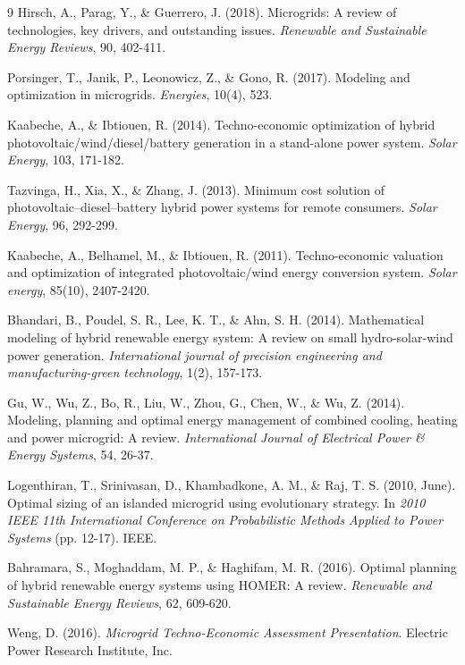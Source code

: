 \documentclass[final,3p,times]{elsarticle}
\begin{document}
\begin{thebibliography}{9}
Hirsch, A., Parag, Y., \& Guerrero, J. (2018). Microgrids: A review of technologies, key drivers, and outstanding issues. \textit{Renewable and Sustainable Energy Reviews}, 90, 402-411.

Porsinger, T., Janik, P., Leonowicz, Z., \& Gono, R. (2017). Modeling and optimization in microgrids. \textit{Energies}, 10(4), 523.

Kaabeche, A., \& Ibtiouen, R. (2014). Techno-economic optimization of hybrid photovoltaic/wind/diesel/battery generation in a stand-alone power system. \textit{Solar Energy}, 103, 171-182.

Tazvinga, H., Xia, X., \& Zhang, J. (2013). Minimum cost solution of photovoltaic–diesel–battery hybrid power systems for remote consumers. \textit{Solar Energy}, 96, 292-299.

Kaabeche, A., Belhamel, M., \& Ibtiouen, R. (2011). Techno-economic valuation and optimization of integrated photovoltaic/wind energy conversion system. \textit{Solar energy}, 85(10), 2407-2420.

Bhandari, B., Poudel, S. R., Lee, K. T., \& Ahn, S. H. (2014). Mathematical modeling of hybrid renewable energy system: A review on small hydro-solar-wind power generation. \textit{International journal of precision engineering and manufacturing-green technology}, 1(2), 157-173.

Gu, W., Wu, Z., Bo, R., Liu, W., Zhou, G., Chen, W., \& Wu, Z. (2014). Modeling, planning and optimal energy management of combined cooling, heating and power microgrid: A review. \textit{International Journal of Electrical Power \& Energy Systems}, 54, 26-37.

Logenthiran, T., Srinivasan, D., Khambadkone, A. M., \& Raj, T. S. (2010, June). Optimal sizing of an islanded microgrid using evolutionary strategy. In \textit{2010 IEEE 11th International Conference on Probabilistic Methods Applied to Power Systems} (pp. 12-17). IEEE.

Bahramara, S., Moghaddam, M. P., \& Haghifam, M. R. (2016). Optimal planning of hybrid renewable energy systems using HOMER: A review. \textit{Renewable and Sustainable Energy Reviews}, 62, 609-620.

Weng, D. (2016). \textit{Microgrid Techno-Economic Assessment Presentation}. Electric Power Research Institute, Inc.


\end{thebibliography}
\end{document}
